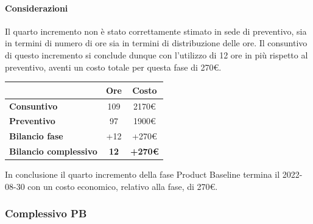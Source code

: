 \paragraph{Considerazioni} \hfill \break
Il quarto incremento non è stato correttamente stimato in sede di preventivo, sia in termini di numero di ore sia 
in termini di distribuzione delle ore. Il consuntivo di questo incremento si conclude dunque con l'utilizzo di 12 ore in più rispetto al preventivo, aventi un costo totale per questa fase di 270\euro.
\begin{center}
	\renewcommand{\arraystretch}{1.8}
	\begin{tabular}{ | l |c|c| }
    \hline
    & \textbf{Ore} & \textbf{Costo} \\
	\hline
    \textbf{Consuntivo} & 109 & 2170\euro \\
    \hline
    \textbf{Preventivo} & 97 & 1900\euro \\
    \hline
    \textbf{Bilancio fase} & +12 & +270\euro \\
    \hline
    \textbf{Bilancio complessivo} & \textbf{12} & \textbf{+270\euro} \\
    \hline
    \end{tabular}
\end{center}
In conclusione il quarto incremento della fase Product Baseline termina il 2022-08-30 con un costo economico, relativo alla fase, di 270\euro.

\subsubsection{Complessivo PB}

